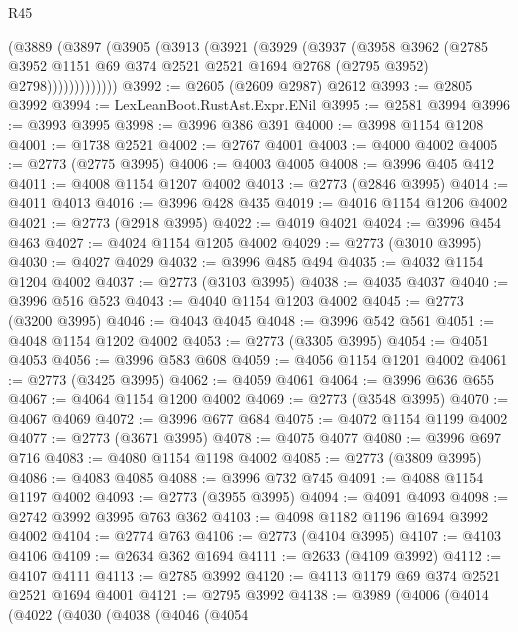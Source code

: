 \begin{lexlean}{R45}
\begin{coremodule}
            (@3889
              (@3897
                (@3905
                  (@3913
                    (@3921
                      (@3929
                        (@3937
                          (@3958
                            @3962
                            (@2785
                              @3952
                              @1151
                              @69
                              @374
                              @2521
                              @2521
                              @1694
                              @2768
                              (@2795 @3952)
                              @2798)))))))))))))
@3992 := @2605 (@2609 @2987) @2612
@3993 := @2805 @3992
@3994 := LexLeanBoot.RustAst.Expr.ENil
@3995 := @2581 @3994
@3996 := @3993 @3995
@3998 := @3996 @386 @391
@4000 := @3998 @1154 @1208
@4001 := @1738 @2521
@4002 := @2767 @4001
@4003 := @4000 @4002
@4005 := @2773 (@2775 @3995)
@4006 := @4003 @4005
@4008 := @3996 @405 @412
@4011 := @4008 @1154 @1207 @4002
@4013 := @2773 (@2846 @3995)
@4014 := @4011 @4013
@4016 := @3996 @428 @435
@4019 := @4016 @1154 @1206 @4002
@4021 := @2773 (@2918 @3995)
@4022 := @4019 @4021
@4024 := @3996 @454 @463
@4027 := @4024 @1154 @1205 @4002
@4029 := @2773 (@3010 @3995)
@4030 := @4027 @4029
@4032 := @3996 @485 @494
@4035 := @4032 @1154 @1204 @4002
@4037 := @2773 (@3103 @3995)
@4038 := @4035 @4037
@4040 := @3996 @516 @523
@4043 := @4040 @1154 @1203 @4002
@4045 := @2773 (@3200 @3995)
@4046 := @4043 @4045
@4048 := @3996 @542 @561
@4051 := @4048 @1154 @1202 @4002
@4053 := @2773 (@3305 @3995)
@4054 := @4051 @4053
@4056 := @3996 @583 @608
@4059 := @4056 @1154 @1201 @4002
@4061 := @2773 (@3425 @3995)
@4062 := @4059 @4061
@4064 := @3996 @636 @655
@4067 := @4064 @1154 @1200 @4002
@4069 := @2773 (@3548 @3995)
@4070 := @4067 @4069
@4072 := @3996 @677 @684
@4075 := @4072 @1154 @1199 @4002
@4077 := @2773 (@3671 @3995)
@4078 := @4075 @4077
@4080 := @3996 @697 @716
@4083 := @4080 @1154 @1198 @4002
@4085 := @2773 (@3809 @3995)
@4086 := @4083 @4085
@4088 := @3996 @732 @745
@4091 := @4088 @1154 @1197 @4002
@4093 := @2773 (@3955 @3995)
@4094 := @4091 @4093
@4098 := @2742 @3992 @3995 @763 @362
@4103 := @4098 @1182 @1196 @1694 @3992 @4002
@4104 := @2774 @763
@4106 := @2773 (@4104 @3995)
@4107 := @4103 @4106
@4109 := @2634 @362 @1694
@4111 := @2633 (@4109 @3992)
@4112 := @4107 @4111
@4113 := @2785 @3992
@4120 := @4113 @1179 @69 @374 @2521 @2521 @1694 @4001
@4121 := @2795 @3992
@4138 := @3989
    (@4006
      (@4014
        (@4022
          (@4030
            (@4038
              (@4046
                (@4054

\end{coremodule}
\end{lexlean}
